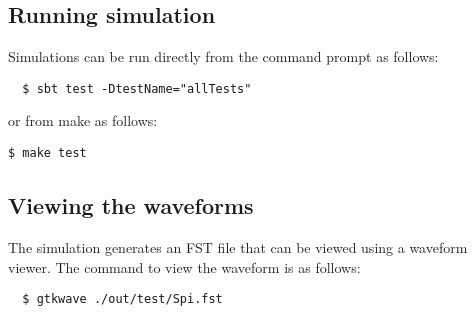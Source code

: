 \subsection{Running simulation}

Simulations can be run directly from the command prompt as follows:

\begin{verbatim}
  $ sbt test -DtestName="allTests"
\end{verbatim}

or from make as follows:

\texttt{\$ make test}

\subsection{Viewing the waveforms}

The simulation generates an FST file that can be viewed using a waveform viewer. The command to view the waveform is as follows:
\begin{verbatim}
  $ gtkwave ./out/test/Spi.fst
\end{verbatim}
